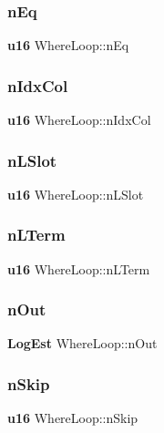 \subsubsection{nEq}
{\footnotesize\ttfamily \textbf{ u16} Where\+Loop\+::n\+Eq}

\mbox{\label{struct_where_loop_a60f90f375a80ca9088629438015725d5}} 
\subsubsection{nIdxCol}
{\footnotesize\ttfamily \textbf{ u16} Where\+Loop\+::n\+Idx\+Col}

\mbox{\label{struct_where_loop_a286a5e96fcc56cc835958ec2cbf6852f}} 
\subsubsection{nLSlot}
{\footnotesize\ttfamily \textbf{ u16} Where\+Loop\+::n\+L\+Slot}

\mbox{\label{struct_where_loop_aaab088ed5c23647675e5afb10eb09338}} 
\subsubsection{nLTerm}
{\footnotesize\ttfamily \textbf{ u16} Where\+Loop\+::n\+L\+Term}

\mbox{\label{struct_where_loop_aaef49d7d8188f3dd94d0c9fd0e727448}} 
\subsubsection{nOut}
{\footnotesize\ttfamily \textbf{ Log\+Est} Where\+Loop\+::n\+Out}

\mbox{\label{struct_where_loop_aa6729780dfb942387abc2f1e0a6b94e7}} 
\subsubsection{nSkip}
{\footnotesize\ttfamily \textbf{ u16} Where\+Loop\+::n\+Skip}

\mbox{\label{struct_where_loop_afa95af92c736222330e4c91167b24746}} 
